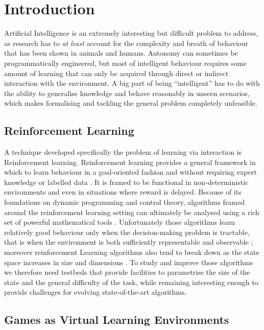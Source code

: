 \chapter{Introduction}

Artificial Intelligence is an extremely interesting but difficult problem to
address, as research has to \emph{at least} account for the complexity and
breath of behaviour that has been shown in animals and humans. Autonomy can
sometimes be programmatically engineered, but most of intelligent behaviour
requires some amount of learning that can only be acquired through direct or
indirect interaction with the environment. A big part of being ``intelligent''
has to do with the ability to generalise knowledge and behave reasonably in
unseen scenarios, which makes formalising and tackling the general problem
completely unfeasible.

\section{Reinforcement Learning}

A technique developed specifically the problem of learning via interaction is
Reinforcement learning. Reinforcement learning provides a general framework in
which to learn behaviour in a goal-oriented fashion and without requiring expert
knowledge or labelled data \citep{Sutton:1998:IRL:551283}. It is framed to be
functional in non-deterministic environments and even in situations where reward
is delayed. Because of its foundations on dynamic programming and control
theory, algorithms framed around the reinforcement learning setting can
ultimately be analysed using a rich set of powerful mathematical tools
\citep{puterman1990markov,beard1997galerkin}. Unfortunately those algorithms
learn relatively good behaviour only when the decision-making problem is
tractable, that is when the environment is both sufficiently representable and
observable \citep{kaelbling1996reinforcement}; moreover reinforcement Learning
algorithms also tend to break down as the state space increases in size and
dimensions \citep{doya2000reinforcement}. To study and improve those algorithms
we therefore need testbeds that provide facilities to parametrise the size of
the state and the general difficulty of the task, while remaining interesting
enough to provide challenges for evolving state-of-the-art algorithms.

\section{Games as Virtual Learning Environments}

